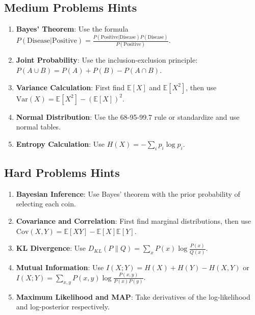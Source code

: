 \subsection*{Medium Problems Hints}

\begin{enumerate}
\item \textbf{Bayes' Theorem}: Use the formula $P(\text{Disease}|\text{Positive}) = \frac{P(\text{Positive}|\text{Disease})P(\text{Disease})}{P(\text{Positive})}$.
\item \textbf{Joint Probability}: Use the inclusion-exclusion principle: $P(A \cup B) = P(A) + P(B) - P(A \cap B)$.
\item \textbf{Variance Calculation}: First find $\mathbb{E}[X]$ and $\mathbb{E}[X^2]$, then use $\text{Var}(X) = \mathbb{E}[X^2] - (\mathbb{E}[X])^2$.
\item \textbf{Normal Distribution}: Use the 68-95-99.7 rule or standardize and use normal tables.
\item \textbf{Entropy Calculation}: Use $H(X) = -\sum_{i} p_i \log p_i$.
\end{enumerate}

\subsection*{Hard Problems Hints}

\begin{enumerate}
\item \textbf{Bayesian Inference}: Use Bayes' theorem with the prior probability of selecting each coin.
\item \textbf{Covariance and Correlation}: First find marginal distributions, then use $\text{Cov}(X,Y) = \mathbb{E}[XY] - \mathbb{E}[X]\mathbb{E}[Y]$.
\item \textbf{KL Divergence}: Use $D_{KL}(P \| Q) = \sum_x P(x) \log \frac{P(x)}{Q(x)}$.
\item \textbf{Mutual Information}: Use $I(X;Y) = H(X) + H(Y) - H(X,Y)$ or $I(X;Y) = \sum_{x,y} P(x,y) \log \frac{P(x,y)}{P(x)P(y)}$.
\item \textbf{Maximum Likelihood and MAP}: Take derivatives of the log-likelihood and log-posterior respectively.
\end{enumerate}
